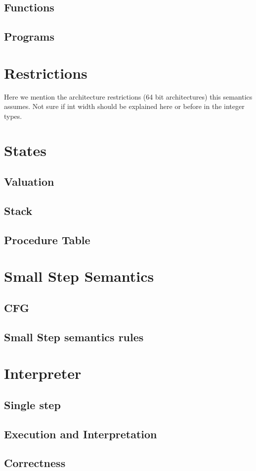 \subsection{Functions}
\subsection{Programs}

\section{Restrictions}

Here we mention the architecture restrictions (64 bit architectures) this semantics assumes.
Not sure if int width should be explained here or before in the integer types.

\section{States}

\subsection{Valuation}
\subsection{Stack}
\subsection{Procedure Table}

\section{Small Step Semantics}

\subsection{CFG}
\subsection{Small Step semantics rules}

\section{Interpreter}

\subsection{Single step}
\subsection{Execution and Interpretation}
\subsection{Correctness}
